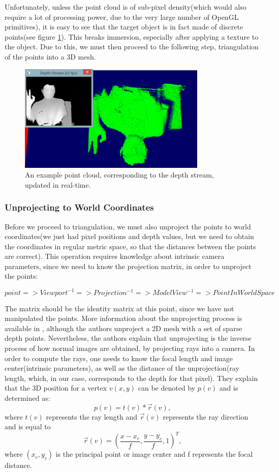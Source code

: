 \documentclass[]{article}
\begin{document}
Unfortunately, unless the point cloud is of sub-pixel density(which would also require a lot of processing power, due to the very large number of OpenGL primitives), it is easy to see that the target object is in fact made of discrete points(see figure \ref{fig:PointCloud}). This breaks immersion, especially after applying a texture to the object. Due to this, we must then proceed to the following step, triangulation of the points into a 3D mesh.

\begin{figure}[hbtp]
    \centering
    \includegraphics[width=0.8\textwidth]{figures/PointCloud.PNG}
    \caption{An example point cloud, corresponding to the depth stream, updated in real-time.}
    \label{fig:PointCloud}
\end{figure}

\subsubsection{Unprojecting to World Coordinates}
\label{sec:unprojecting}

 Before we proceed to triangulation, we must also unproject the points to world coordinates(we just had pixel positions and depth values, but we need to obtain the coordinates in regular metric space, so that the distances between the points are correct). This operation requires knowledge about intrinsic camera parameters, since we need to know the projection matrix, in order to unproject the points:

$$point => Viewport^{-1} => Projection^{-1} => ModelView^{-1} => PointInWorldSpace$$

The  matrix should be the identity matrix at this point, since we have not manipulated the points.
More information about the unprojecting process is available in \cite{sung2013}, although the authors unproject a 2D mesh with a set of sparse depth points. Nevertheless, the authors explain that unprojecting is the inverse process of how normal images are obtained, by projecting rays into a camera. In order to compute the rays, one needs to know the focal length and image center(intrinsic parameters), as well as the distance of the unprojection(ray length, which, in our case, corresponds to the depth for that pixel). They explain that the 3D position for a vertex $v(x,y)$ can be denoted by $p(v)$ and is determined as:
$$p(v) = t(v) *\vec{r}(v),$$
where $t(v)$ represents the ray length and $\vec{r}(v)$ represents the ray direction and is equal to $$\vec{r}(v) = (\frac{x - x_{c}}{f},\frac{y-y_{c}}{f},1)^T,$$ where $(x_{c}, y_{c})$ is the principal point or image center and f represents the focal distance.
\end{document}
